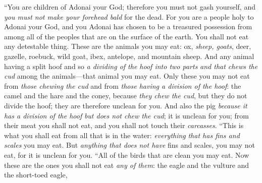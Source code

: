 \begin{biblechapter} %
\verse “You are children of Adonai your God; therefore you must not gash yourself, and \textit{you must not make your forehead bald} for the dead.
\verse For you are a people holy to Adonai your God, and you Adonai has chosen to be a treasured possession from among all of the peoples that are on the surface of the earth.
\verse You shall not eat any detestable thing.
\verse These are the animals you may eat: ox, \textit{sheep, goats},
\verse deer, gazelle, roebuck, wild goat, ibex, antelope, and mountain sheep.
\verse And any animal having a split hoof and so \textit{a dividing of the hoof into two parts} \textit{and that chews the cud} among the animals—that animal you may eat.
\verse Only these you may not eat from \textit{those chewing the cud} and from \textit{those having a division of the hoof}: the camel and the hare and the coney, because \textit{they chew the cud}, but they do not divide the hoof; they are therefore unclean for you.
\verse And also the pig \textit{because it has a division of the hoof} \textit{but does not chew the cud}; it is unclean for you; from their meat you shall not eat, and you shall not touch their \textit{carcasses}.
\verse “This is what you shall eat from all that is in the water: \textit{everything} \textit{that has fins and scales} you may eat.
\verse But \textit{anything that does not have} fins and scales, you may not eat, for it is unclean for you.
\verse “All of the birds that are clean you may eat.
\verse Now these are the ones you shall not eat \textit{any of them}: the eagle and the vulture and the short-toed eagle,

\end{biblechapter}
